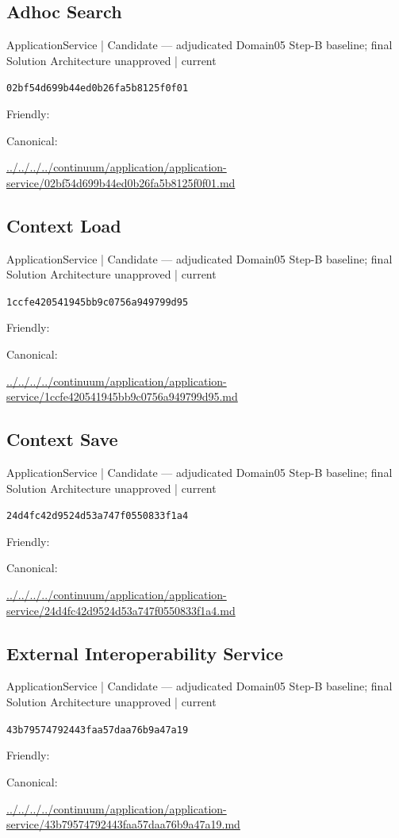 \documentclass[10pt,a4paper]{article}
\begin{document}
\subsection*{Adhoc Search}
{\small ApplicationService | Candidate — adjudicated Domain05 Step-B baseline; final Solution Architecture unapproved | current}\par
\texttt{02bf54d699b44ed0b26fa5b8125f0f01}\par
Friendly: \par
Canonical: \par
{\footnotesize\url{../../../../continuum/application/application-service/02bf54d699b44ed0b26fa5b8125f0f01.md}}\par
\subsection*{Context Load}
{\small ApplicationService | Candidate — adjudicated Domain05 Step-B baseline; final Solution Architecture unapproved | current}\par
\texttt{1ccfe420541945bb9c0756a949799d95}\par
Friendly: \par
Canonical: \par
{\footnotesize\url{../../../../continuum/application/application-service/1ccfe420541945bb9c0756a949799d95.md}}\par
\subsection*{Context Save}
{\small ApplicationService | Candidate — adjudicated Domain05 Step-B baseline; final Solution Architecture unapproved | current}\par
\texttt{24d4fc42d9524d53a747f0550833f1a4}\par
Friendly: \par
Canonical: \par
{\footnotesize\url{../../../../continuum/application/application-service/24d4fc42d9524d53a747f0550833f1a4.md}}\par
\subsection*{External Interoperability Service}
{\small ApplicationService | Candidate — adjudicated Domain05 Step-B baseline; final Solution Architecture unapproved | current}\par
\texttt{43b79574792443faa57daa76b9a47a19}\par
Friendly: \par
Canonical: \par
{\footnotesize\url{../../../../continuum/application/application-service/43b79574792443faa57daa76b9a47a19.md}}\par
\end{document}
